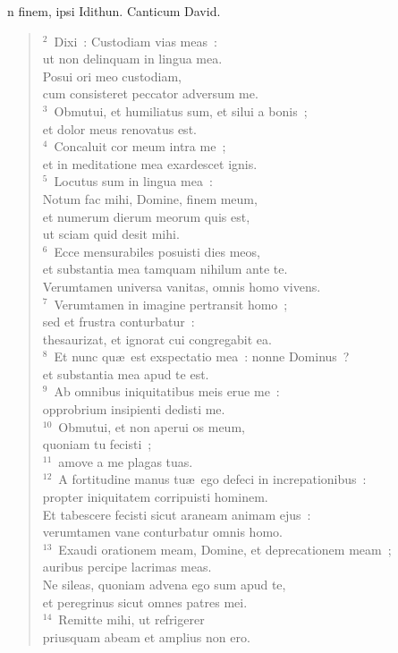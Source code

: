 \bchapter[Psalm]
n finem, ipsi Idithun. Canticum David.
\begin{verse}${}^{2}$~Dixi~: Custodiam vias meas~:\\ ut non delinquam in lingua mea.\\ Posui ori meo custodiam,\\ cum consisteret peccator adversum me.\\
${}^{3}$~Obmutui, et humiliatus sum, et silui a bonis~;\\ et dolor meus renovatus est.\\
${}^{4}$~Concaluit cor meum intra me~;\\ et in meditatione mea exardescet ignis.\\
${}^{5}$~Locutus sum in lingua mea~:\\ Notum fac mihi, Domine, finem meum,\\ et numerum dierum meorum quis est,\\ ut sciam quid desit mihi.\\
${}^{6}$~Ecce mensurabiles posuisti dies meos,\\ et substantia mea tamquam nihilum ante te.\\ Verumtamen universa vanitas, omnis homo vivens.\\
${}^{7}$~Verumtamen in imagine pertransit homo~;\\ sed et frustra conturbatur~:\\ thesaurizat, et ignorat cui congregabit ea.\\
${}^{8}$~Et nunc qu\ae\ est exspectatio mea~: nonne Dominus~?\\ et substantia mea apud te est.\\
${}^{9}$~Ab omnibus iniquitatibus meis erue me~:\\ opprobrium insipienti dedisti me.\\
${}^{10}$~Obmutui, et non aperui os meum,\\ quoniam tu fecisti~;\\
${}^{11}$~amove a me plagas tuas.\\
${}^{12}$~A fortitudine manus tu\ae\ ego defeci in increpationibus~:\\ propter iniquitatem corripuisti hominem.\\ Et tabescere fecisti sicut araneam animam ejus~:\\ verumtamen vane conturbatur omnis homo.\\
${}^{13}$~Exaudi orationem meam, Domine, et deprecationem meam~;\\ auribus percipe lacrimas meas.\\ Ne sileas, quoniam advena ego sum apud te,\\ et peregrinus sicut omnes patres mei.\\
${}^{14}$~Remitte mihi, ut refrigerer\\ priusquam abeam et amplius non ero.\end{verse}



